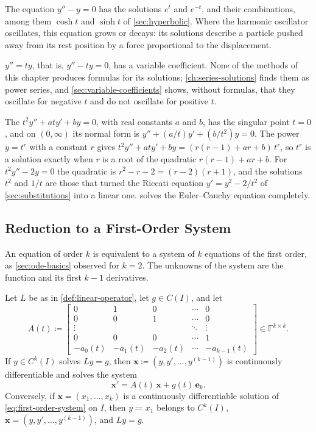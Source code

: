 The equation $y''-y=0$ has the solutions $e^t$ and $e^{-t}$, and their combinations, among them $\cosh t$ and $\sinh t$ of \cref{sec:hyperbolic}. Where the harmonic oscillator oscillates, this equation grows or decays: its solutions describe a particle pushed away from its rest position by a force proportional to the displacement.

 $y''=ty$, that is, $y''-ty=0$, has a variable coefficient. None of the methods of this chapter produces formulas for its solutions; \cref{ch:series-solutions} finds them as power series, and \cref{sec:variable-coefficients} shows, without formulas, that they oscillate for negative $t$ and do not oscillate for positive $t$.

The  $t^2y''+aty'+by=0$, with real constants $a$ and $b$, has the singular point $t=0$, and on $(0,\infty)$ its normal form is $y''+(a/t)y'+(b/t^2)y=0$. The power $y=t^r$ with a constant $r$ gives $t^2y''+aty'+by=(r(r-1)+ar+b)\,t^r$, so $t^r$ is a solution exactly when $r$ is a root of the quadratic $r(r-1)+ar+b$. For $t^2y''-2y=0$ the quadratic is $r^2-r-2=(r-2)(r+1)$, and the solutions $t^2$ and $1/t$ are those that turned the Riccati equation $y'=y^2-2/t^2$ of \cref{sec:substitutions} into a linear one.  solves the Euler--Cauchy equation completely.

\subsection{Reduction to a First-Order System}

An equation of order $k$ is equivalent to a system of $k$ equations of the first order, as \cref{sec:ode-basics} observed for $k=2$. The unknowns of the system are the function and its first $k-1$ derivatives.

\begin{proposition}
\label{prop:companion-system}
Let $L$ be as in \cref{def:linear-operator}, let $g\in C(I)$, and let
\begin{equation}
A(t)\coloneqq\begin{bmatrix}0&1&0&\cdots&0\\0&0&1&\cdots&0\\\vdots&&&\ddots&\vdots\\0&0&0&\cdots&1\\-a_0(t)&-a_1(t)&-a_2(t)&\cdots&-a_{k-1}(t)\end{bmatrix}\in\mathbb F^{k\times k} .
\label{eq:companion-system}
\end{equation}
If $y\in C^k(I)$ solves $Ly=g$, then $\mathbf x\coloneqq(y,y',\ldots,y^{(k-1)})$ is continuously differentiable and solves the system
\begin{equation}
\mathbf x'=A(t)\,\mathbf x+g(t)\,\mathbf e_k .
\label{eq:first-order-system}
\end{equation}
Conversely, if $\mathbf x=(x_1,\ldots,x_k)$ is a continuously differentiable solution of \eqref{eq:first-order-system} on $I$, then $y\coloneqq x_1$ belongs to $C^k(I)$, $\mathbf x=(y,y',\ldots,y^{(k-1)})$, and $Ly=g$.
\end{proposition}


